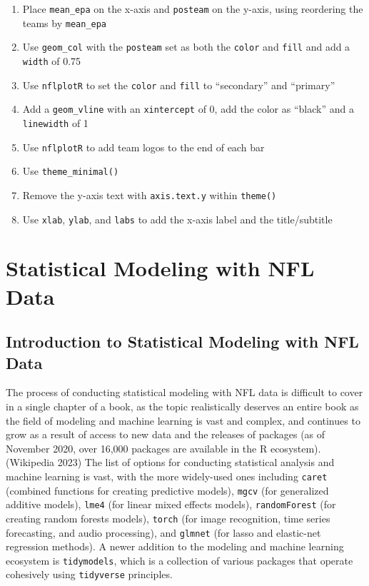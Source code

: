 \documentclass[
  letterpaper,
]{krantz}
\providecommand{\tightlist}{%
  \setlength{\itemsep}{0pt}\setlength{\parskip}{0pt}}\usepackage{longtable,booktabs,array}
\begin{document}
\begin{enumerate}
\def\labelenumi{\arabic{enumi}.}
\tightlist
\item
  Place \texttt{mean\_epa} on the x-axis and \texttt{posteam} on the
  y-axis, using reordering the teams by \texttt{mean\_epa}
\item
  Use \texttt{geom\_col} with the \texttt{posteam} set as both the
  \texttt{color} and \texttt{fill} and add a \texttt{width} of 0.75
\item
  Use \texttt{nflplotR} to set the \texttt{color} and \texttt{fill} to
  ``secondary'' and ``primary''
\item
  Add a \texttt{geom\_vline} with an \texttt{xintercept} of 0, add the
  color as ``black'' and a \texttt{linewidth} of 1
\item
  Use \texttt{nflplotR} to add team logos to the end of each bar
\item
  Use \texttt{theme\_minimal()}
\item
  Remove the y-axis text with \texttt{axis.text.y} within
  \texttt{theme()}
\item
  Use \texttt{xlab}, \texttt{ylab}, and \texttt{labs} to add the x-axis
  label and the title/subtitle
\end{enumerate}


\hypertarget{statistical-modeling-with-nfl-data}{%
\chapter{Statistical Modeling with NFL
Data}\label{statistical-modeling-with-nfl-data}}

\hypertarget{introduction-to-statistical-modeling-with-nfl-data}{%
\section{Introduction to Statistical Modeling with NFL
Data}\label{introduction-to-statistical-modeling-with-nfl-data}}

The process of conducting statistical modeling with NFL data is
difficult to cover in a single chapter of a book, as the topic
realistically deserves an entire book as the field of modeling and
machine learning is vast and complex, and continues to grow as a result
of access to new data and the releases of packages (as of November 2020,
over 16,000 packages are available in the R ecosystem).(Wikipedia 2023)
The list of options for conducting statistical analysis and machine
learning is vast, with the more widely-used ones including
\texttt{caret} (combined functions for creating predictive models),
\texttt{mgcv} (for generalized additive models), \texttt{lme4} (for
linear mixed effects models), \texttt{randomForest} (for creating random
forests models), \texttt{torch} (for image recognition, time series
forecasting, and audio processing), and \texttt{glmnet} (for lasso and
elastic-net regression methods). A newer addition to the modeling and
machine learning ecosystem is \texttt{tidymodels}, which is a collection
of various packages that operate cohesively using \texttt{tidyverse}
principles.
\end{document}
